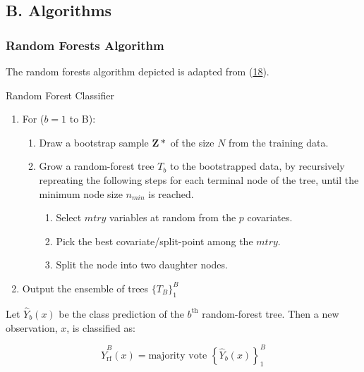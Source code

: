 \documentclass[12pt,]{article}
\newcommand{\appendixB}{ \setcounter{table}{0} \renewcommand{\thetable}{B\arabic{table}} \setcounter{figure}{0} \renewcommand{\thefigure}{B\arabic{figure}} }
\begin{document}
\newpage

\subsection*{B. Algorithms}\label{b.-algorithms}

\appendixB

\subsubsection{Random Forests Algorithm}\label{random-forests-algorithm}

The random forests algorithm depicted is adapted from
(\protect\hyperlink{ref-hastie_elements_2009}{18}).

\begin{algorithm}[H]
\label{alg:random-forests-alg}
\caption{Random Forest Classifier}
\DontPrintSemicolon
\SetAlgoLined
\BlankLine

\begin{enumerate}
  \item For ($b=1$ to B):
    \begin{enumerate}
      \item Draw a bootstrap sample $\mathbf{Z*}$ of the size $N$ from the training data.
      \item Grow a random-forest tree $T_b$ to the bootstrapped data, by recursively repreating the following steps for each terminal node of the tree, until the minimum node size $n_{min}$ is reached.
      \begin{enumerate}
        \item Select $mtry$ variables at random from the $p$ covariates. 
        \item Pick the best covariate/split-point among the $mtry$. 
        \item Split the node into two daughter nodes. 
      \end{enumerate}
    \end{enumerate}
  \item Output the ensemble of trees $\{T_B\}^B_1$
\end{enumerate}
\BlankLine

Let $\hat{Y}_b(x)$ be the class prediction of the $b^{\text{th}}$ random-forest tree.  Then a new observation, $x$, is classified as:

$$\hat{Y}^B_{\text{rf}}(x) = \text{majority vote } \left\{ \hat{Y}_b(x) \right\}^B_1$$

\end{algorithm}
\end{document}
